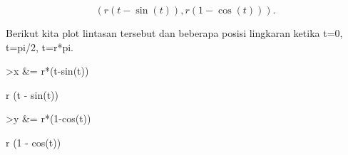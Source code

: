\documentclass[a4paper,10pt]{article}
\begin{document}
\begin{eulernotebook}
\begin{eulercomment}
\begin{eulercomment}
\begin{eulercomment}
\begin{eulercomment}
\begin{eulercomment}
\begin{eulercomment}
\begin{eulercomment}
\begin{eulercomment}
\begin{eulercomment}
\begin{eulercomment}
\begin{eulercomment}
\begin{eulercomment}
\begin{eulercomment}
\begin{eulercomment}
\begin{eulercomment}
\begin{eulercomment}
\begin{eulercomment}
\begin{eulercomment}
\begin{eulercomment}
\begin{eulercomment}
\begin{eulercomment}
\begin{eulercomment}
\begin{eulercomment}
\end{eulercomment}
\begin{eulerformula}
\[
(r(t-\sin(t)),r(1-\cos(t))).
\]
\end{eulerformula}
\begin{eulercomment}
Berikut kita plot lintasan tersebut dan beberapa posisi lingkaran
ketika t=0, t=pi/2, t=r*pi.
\end{eulercomment}
\begin{eulerprompt}
>x &= r*(t-sin(t))
\end{eulerprompt}
\begin{euleroutput}
  
                              r (t - sin(t))
  
\end{euleroutput}
\begin{eulerprompt}
>y &= r*(1-cos(t))
\end{eulerprompt}
\begin{euleroutput}
  
                              r (1 - cos(t))
  

\end{euleroutput}
\end{eulercomment}
\end{eulercomment}
\end{eulercomment}
\end{eulercomment}
\end{eulercomment}
\end{eulercomment}
\end{eulercomment}
\end{eulercomment}
\end{eulercomment}
\end{eulercomment}
\end{eulercomment}
\end{eulercomment}
\end{eulercomment}
\end{eulercomment}
\end{eulercomment}
\end{eulercomment}
\end{eulercomment}
\end{eulercomment}
\end{eulercomment}
\end{eulercomment}
\end{eulercomment}
\end{eulercomment}
\end{eulernotebook}
\end{document}
